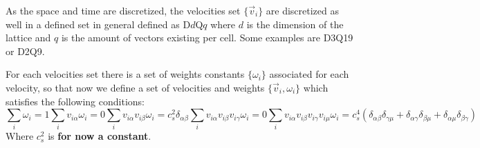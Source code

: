 As the space and time are discretized, the velocities set $\{\vec v_i\}$ are discretized as well in a defined set in general defined as D$d$Q$q$ where $d$ is the dimension of the lattice and $q$ is the amount of vectors existing per cell. Some examples are D3Q19 or D2Q9. 

For each velocities set there is a set of weights constants $\{\omega_i\}$ associated for each velocity, so that now we define a set of velocities and weights $\{\vec v_i,\omega_i\}$ which satisfies the following conditions:
\begin{subequations}\label{eqs:sums_vw}
\begin{equation}\label{eq:sum_wi}
    \sum_i \omega_i = 1
\end{equation}
\begin{equation}\label{eq:sum_viwi}
    \sum_i v_{i\alpha}\omega_i = 0
\end{equation}
\begin{equation}\label{eq:sum_viviwi}
    \sum_i v_{i\alpha}v_{i\beta}\omega_i = c_s^2\delta_{\alpha\beta}
\end{equation}
\begin{equation}\label{eq:sum_viviviwi}
    \sum_i v_{i\alpha}v_{i\beta}v_{i\gamma}\omega_i = 0
\end{equation}
\begin{equation}\label{eq:sum_viviviviwi}
    \sum_i v_{i\alpha}v_{i\beta}v_{i\gamma}v_{i\mu}\omega_i = c_s^4(\delta_{\alpha\beta}\delta_{\gamma\mu} + \delta_{\alpha\gamma}\delta_{\beta\mu} + \delta_{\alpha\mu}\delta_{\beta\gamma})
\end{equation}
\end{subequations}
Where $c_s^2$ is \textbf{for now a constant}.

